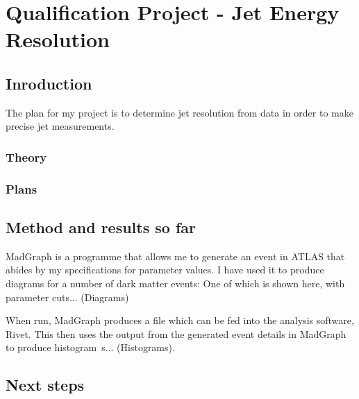 \documentclass[12pt, a4paper]{article}
\begin{document}
\section{Qualification Project - Jet Energy Resolution}
\subsection{Inroduction}

The plan for my project is to determine jet resolution from data in order to make precise jet measurements.
\subsubsection{Theory}


\subsubsection{Plans}

\subsection{Method and results so far}
MadGraph is a programme that allows me to generate an event in ATLAS that abides by my specifications for parameter values.
I have used it to produce diagrams for a number of dark matter events:
One of which is shown here, with parameter cuts...
(Diagrams)

When run, MadGraph produces a file which can be fed into the analysis software, Rivet. This then uses the output from the generated event details in MadGraph to produce histogram\
s... (Histograms).

\subsection{Next steps}
\end{document}
